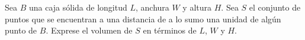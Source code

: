 \item Sea $B$ una caja sólida de longitud $L$, anchura $W$ y altura $H$. Sea $S$ el conjunto de puntos que se encuentran a una distancia de a lo sumo una unidad de algún punto de $B$. Exprese el volumen de $S$ en términos de $L$, $W$ y $H$.
